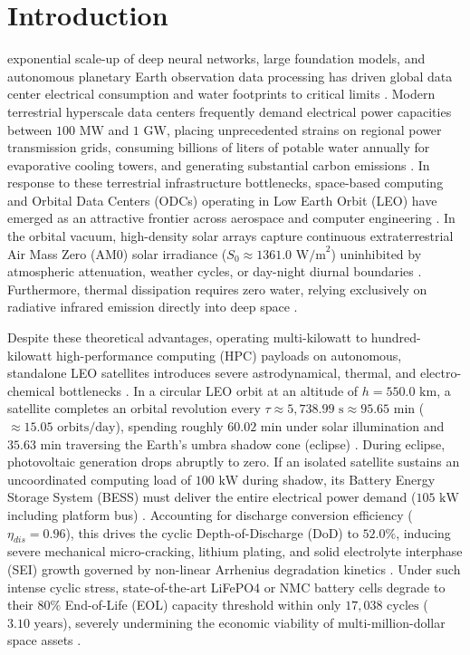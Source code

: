 \documentclass[journal]{IEEEtran}
\begin{document}
\section{Introduction}
 exponential scale-up of deep neural networks, large foundation models, and autonomous planetary Earth observation data processing has driven global data center electrical consumption and water footprints to critical limits \cite{barroso2019datacenter, bloch2026earth}. Modern terrestrial hyperscale data centers frequently demand electrical power capacities between $100\text{ MW}$ and $1\text{ GW}$, placing unprecedented strains on regional power transmission grids, consuming billions of liters of potable water annually for evaporative cooling towers, and generating substantial carbon emissions \cite{bloch2026earth, liu2015greening}. In response to these terrestrial infrastructure bottlenecks, space-based computing and Orbital Data Centers (ODCs) operating in Low Earth Orbit (LEO) have emerged as an attractive frontier across aerospace and computer engineering \cite{aguera2025towards, turyshev2026orbital, bleier2023space}. In the orbital vacuum, high-density solar arrays capture continuous extraterrestrial Air Mass Zero (AM0) solar irradiance ($S_0 \approx 1361.0\text{ W/m}^2$) uninhibited by atmospheric attenuation, weather cycles, or day-night diurnal boundaries \cite{kopp2011new, wertz2011space}. Furthermore, thermal dissipation requires zero water, relying exclusively on radiative infrared emission directly into deep space \cite{gilmore2002spacecraft}.

Despite these theoretical advantages, operating multi-kilowatt to hundred-kilowatt high-performance computing (HPC) payloads on autonomous, standalone LEO satellites introduces severe astrodynamical, thermal, and electro-chemical bottlenecks \cite{turyshev2026orbital, denby2020orbital, kim2025gpu}. In a circular LEO orbit at an altitude of $h = 550.0\text{ km}$, a satellite completes an orbital revolution every $\tau \approx 5,738.99\text{ s} \approx 95.65\text{ min}$ ($\approx 15.05\text{ orbits/day}$), spending roughly $60.02\text{ min}$ under solar illumination and $35.63\text{ min}$ traversing the Earth's umbra shadow cone (eclipse) \cite{curtis2014orbital, patel2005spacecraft}. During eclipse, photovoltaic generation drops abruptly to zero. If an isolated satellite sustains an uncoordinated computing load of $100\text{ kW}$ during shadow, its Battery Energy Storage System (BESS) must deliver the entire electrical power demand ($105\text{ kW}$ including platform bus) \cite{patel2005spacecraft, li2024battery}. Accounting for discharge conversion efficiency ($\eta_{dis} = 0.96$), this drives the cyclic Depth-of-Discharge (DoD) to $52.0\%$, inducing severe mechanical micro-cracking, lithium plating, and solid electrolyte interphase (SEI) growth governed by non-linear Arrhenius degradation kinetics \cite{wang2011cycle, xu2018modeling}. Under such intense cyclic stress, state-of-the-art LiFePO4 or NMC battery cells degrade to their $80\%$ End-of-Life (EOL) capacity threshold within only $17,038\text{ cycles}$ ($3.10\text{ years}$), severely undermining the economic viability of multi-million-dollar space assets \cite{turyshev2026orbital, leyva2023satellite}.
\end{document}
